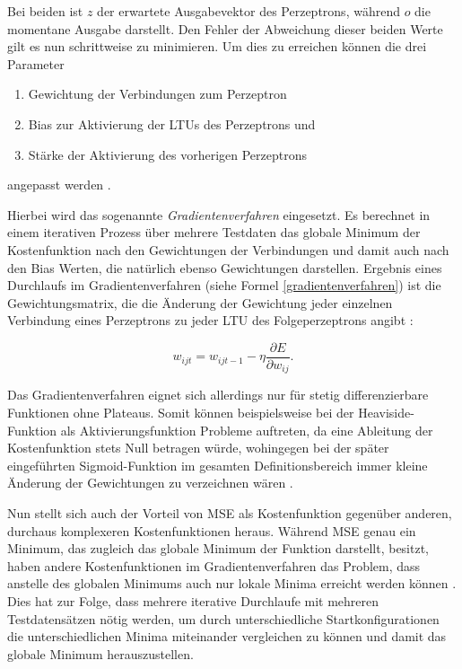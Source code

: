 Bei beiden ist $z$ der erwartete Ausgabevektor des Perzeptrons, während $o$ die momentane Ausgabe darstellt. Den Fehler der Abweichung dieser beiden Werte gilt es nun schrittweise zu minimieren. Um dies zu erreichen können die drei Parameter

\begin{enumerate}
	\item Gewichtung der Verbindungen zum Perzeptron
	\item Bias zur Aktivierung der LTUs des Perzeptrons und
	\item Stärke der Aktivierung des vorherigen Perzeptrons
\end{enumerate}

angepasst werden \cite{AurelienGeron.2018}. 

Hierbei wird das sogenannte \textit{Gradientenverfahren} eingesetzt. Es berechnet in einem iterativen Prozess über mehrere Testdaten das globale Minimum der Kostenfunktion nach den Gewichtungen der Verbindungen und damit auch nach den Bias Werten, die natürlich ebenso Gewichtungen darstellen. Ergebnis eines Durchlaufs im Gradientenverfahren (siehe Formel \ref{gradientenverfahren}) ist die Gewichtungsmatrix, die die Änderung der Gewichtung jeder einzelnen Verbindung eines Perzeptrons zu jeder LTU des Folgeperzeptrons angibt \cite{AurelienGeron.2018}:

\begin{equation} \label{gradientenverfahren}
w_{ijt} = w_{ijt-1} - \eta\frac{\partial E}{\partial w_{ij}}.
\end{equation}

Das Gradientenverfahren eignet sich allerdings nur für stetig differenzierbare Funktionen ohne Plateaus. Somit können beispielsweise bei der Heaviside-Funktion als Aktivierungsfunktion Probleme auftreten, da eine Ableitung der Kostenfunktion stets Null betragen würde, wohingegen bei der später eingeführten Sigmoid-Funktion im gesamten Definitionsbereich immer kleine Änderung der Gewichtungen zu verzeichnen wären \cite{AurelienGeron.2018}.

Nun stellt sich auch der Vorteil von MSE als Kostenfunktion gegenüber anderen, durchaus komplexeren Kostenfunktionen heraus. Während MSE genau ein Minimum, das zugleich das globale Minimum der Funktion darstellt, besitzt, haben andere Kostenfunktionen im Gradientenverfahren das Problem, dass anstelle des globalen Minimums auch nur lokale Minima erreicht werden können \cite{AurelienGeron.2018}. Dies hat zur Folge, dass mehrere iterative Durchlaufe mit mehreren Testdatensätzen nötig werden, um durch unterschiedliche Startkonfigurationen die unterschiedlichen Minima miteinander vergleichen zu können und damit das globale Minimum herauszustellen.

